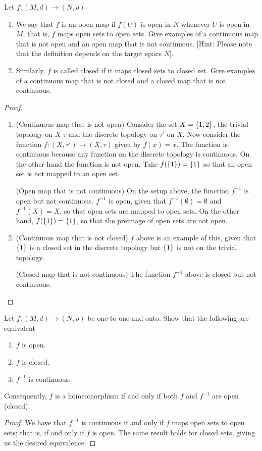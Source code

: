 \begin{exercise}{56}
Let $f:(M,d)\to (N,\rho)$.
\begin{enumerate}
    \item We say that $f$ is an open map if $f(U)$ is open in $N$ whenever $U$ is open in $M$;
    that is, $f$ maps open sets to open sets.
    Give examples of a continuous map that is not open and an open map that is not continuous.
    [Hint: Please note that the definition depends on the target space $N$].
    \item Similarly, $f$ is called closed if it maps closed sets to closed set.
    Give examples of a continuous map that is not closed and a closed map that is not continuous.
\end{enumerate}
\end{exercise}
\begin{proof}
\begin{enumerate}
    \item 
    (Continuous map that is not open)
    Consider the set $X=\{1,2\}$, the trivial topology on $X$ $\tau$ and the discrete topology on $\tau'$ on $X$.
    Now consider the function $f:(X,\tau')\to (X,\tau)$ given by $f(x)=x$.
    The function is continuous because any function on the discrete topology is continuous.
    On the other hand the function is not open.
    Take $f(\{1\})=\{1\}$ so that an open set is not mapped to an open set.

    (Open map that is not continuous)
    On the setup above, the function $f^{-1}$ is open but not continuous.
    $f^{-1}$ is open, given that $f^{-1}(\emptyset)=\emptyset$ and $f^{-1}(X)=X$, so that open sets are mapped to open sets.
    On the other hand, $f(\{1\})=\{1\}$, so that the preimage of open sets are not open.
    
    \item
    (Continuous map that is not closed)
    $f$ above is an example of this, given that $\{1\}$ is a closed set in the discrete topology but $\{1\}$ is not on the trivial topology.

    (Closed map that is not continuous)
    The function $f^{-1}$ above is closed but not continuous.
\end{enumerate}
\end{proof} 

\begin{exercise}{57}
Let $f:(M,d)\to(N,\rho)$ be one-to-one and onto.
Show that the following are equivalent
\begin{enumerate}
    \item $f$ is open.
    \item $f$ is closed.
    \item $f^{-1}$ is continuous.
\end{enumerate}
Consequently, $f$ is a homeomorphism if and only if both $f$ and $f^{-1}$ are open (closed).
\end{exercise}
\begin{proof}
We have that $f^{-1}$ is continuous if and only if $f$ maps open sets to open sets;
that is, if and only if $f$ is open.
The same result holds for closed sets, giving us the desired equivalence.
\end{proof} 

